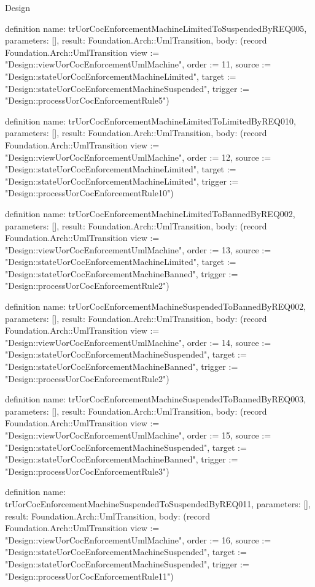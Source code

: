 \begin{lexlean}{Design}
\begin{semanticmodule}
definition{
  name: trUorCocEnforcementMachineLimitedToSuspendedByREQ005,
  parameters: [],
  result: Foundation.Arch::UmlTransition,
  body: (record Foundation.Arch::UmlTransition {view := "Design::viewUorCocEnforcementUmlMachine", order := 11, source := "Design::stateUorCocEnforcementMachineLimited", target := "Design::stateUorCocEnforcementMachineSuspended", trigger := "Design::processUorCocEnforcementRule5"})
}

definition{
  name: trUorCocEnforcementMachineLimitedToLimitedByREQ010,
  parameters: [],
  result: Foundation.Arch::UmlTransition,
  body: (record Foundation.Arch::UmlTransition {view := "Design::viewUorCocEnforcementUmlMachine", order := 12, source := "Design::stateUorCocEnforcementMachineLimited", target := "Design::stateUorCocEnforcementMachineLimited", trigger := "Design::processUorCocEnforcementRule10"})
}

definition{
  name: trUorCocEnforcementMachineLimitedToBannedByREQ002,
  parameters: [],
  result: Foundation.Arch::UmlTransition,
  body: (record Foundation.Arch::UmlTransition {view := "Design::viewUorCocEnforcementUmlMachine", order := 13, source := "Design::stateUorCocEnforcementMachineLimited", target := "Design::stateUorCocEnforcementMachineBanned", trigger := "Design::processUorCocEnforcementRule2"})
}

definition{
  name: trUorCocEnforcementMachineSuspendedToBannedByREQ002,
  parameters: [],
  result: Foundation.Arch::UmlTransition,
  body: (record Foundation.Arch::UmlTransition {view := "Design::viewUorCocEnforcementUmlMachine", order := 14, source := "Design::stateUorCocEnforcementMachineSuspended", target := "Design::stateUorCocEnforcementMachineBanned", trigger := "Design::processUorCocEnforcementRule2"})
}

definition{
  name: trUorCocEnforcementMachineSuspendedToBannedByREQ003,
  parameters: [],
  result: Foundation.Arch::UmlTransition,
  body: (record Foundation.Arch::UmlTransition {view := "Design::viewUorCocEnforcementUmlMachine", order := 15, source := "Design::stateUorCocEnforcementMachineSuspended", target := "Design::stateUorCocEnforcementMachineBanned", trigger := "Design::processUorCocEnforcementRule3"})
}

definition{
  name: trUorCocEnforcementMachineSuspendedToSuspendedByREQ011,
  parameters: [],
  result: Foundation.Arch::UmlTransition,
  body: (record Foundation.Arch::UmlTransition {view := "Design::viewUorCocEnforcementUmlMachine", order := 16, source := "Design::stateUorCocEnforcementMachineSuspended", target := "Design::stateUorCocEnforcementMachineSuspended", trigger := "Design::processUorCocEnforcementRule11"})
}


\end{semanticmodule}
\end{lexlean}
